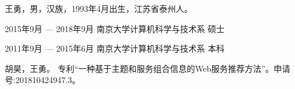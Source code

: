 \documentclass[master,winfonts]{njuthesis}
\begin{document}
\nocite{*}

%
%

\appendix

\backmatter
\begin{resume}
\begin{authorinfo}
\noindent 王勇，男，汉族，1993年4月出生，江苏省泰州人。
\end{authorinfo}
\begin{education}
\item[2015年9月 --- 2018年9月] 南京大学计算机科学与技术系 \hfill 硕士
\item[2011年9月 --- 2015年6月] 南京大学计算机科学与技术系 \hfill 本科
\end{education}
\begin{publications}
\item 胡昊，王勇。 专利“一种基于主题和服务组合信息的Web服务推荐方法”。申请号:201810424947.3。
\end{publications}
\end{resume}

\makelicense

\end{document}
